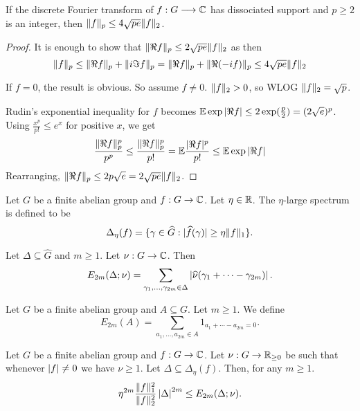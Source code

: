 \begin{lemma}
\label{rudin}
\leanok
If the discrete Fourier transform of $f : G \longrightarrow \mathbb{C}$ has dissociated support and $p \ge 2$ is an integer, then $\lVert f\rVert_p \le 4\sqrt{pe} \lVert f\rVert_2$.
\end{lemma}
\begin{proof}
\leanok
It is enough to show that $\lVert \Re f\rVert_p \le 2\sqrt{pe} \lVert f\rVert_2$ as then
$$\lVert f\rVert_p \le \lVert \Re f\rVert_p + \lVert i \Im f\rVert_p = \lVert \Re f\rVert_p + \lVert \Re (-if)\rVert_p \le 4\sqrt{pe} \lVert f\rVert_2$$

If $f = 0$, the result is obvious. So assume $f \ne 0$. $\lVert f\rVert_2 > 0$, so WLOG $\lVert f\rVert_2 = \sqrt p$.

Rudin's exponential inequality for $f$ becomes $\mathbb{E} \exp|\Re f| \le 2\exp(\frac p 2) = (2\sqrt e)^p$. Using $\frac{x^p}{p!} \le e^x$ for positive $x$, we get
$$\frac{\lVert \Re f\rVert_p^p}{p^p} \le \frac{\lVert \Re f\rVert_p^p}{p!} = \mathbb{E} \frac{|\Re f|^p}{p!} \le \mathbb{E} \exp|\Re f|$$
Rearranging, $\lVert \Re f\rVert_p \le 2 p\sqrt{e} = 2 \sqrt{pe} \lVert f\rVert_2$.
\end{proof}


\begin{definition}
\label{large_spec}
\leanok
Let $G$ be a finite abelian group and $f:G\to\mathbb{C}$. Let $\eta\in \mathbb{R}$. The $\eta$-large spectrum is defined to be
\[\Delta_\eta(f) = \{ \gamma\in\widehat{G} : \lvert \widehat{f}(\gamma)\rvert \geq \eta\lVert f\rVert_1\}.\]
\end{definition}


\begin{definition}
\label{weight_energy}
\leanok
Let $\Delta\subseteq \widehat{G}$ and $m\geq 1$. Let $\nu:G\to \mathbb{C}$. Then
\[E_{2m}(\Delta;\nu)=\sum_{\gamma_1,\ldots,\gamma_{2m}\in \Delta}\left\lvert \widehat{\nu}(\gamma_1+\cdots-\gamma_{2m})\right\rvert.\]
\end{definition}


\begin{definition}[Energy]
\label{energy}
\leanok
Let $G$ be a finite abelian group and $A\subseteq G$. Let $m\geq 1$. We define
\[E_{2m}(A)=\sum_{a_1,\ldots,a_{2m}\in A}1_{a_1+\cdots-a_{2m}=0}.\]
\end{definition}


\begin{lemma}
\label{general_hoelder}
\leanok
Let $G$ be a finite abelian group and $f:G\to\mathbb{C}$. Let $\nu:G\to \mathbb{R}_{\geq 0}$ be such that whenever $\left\lvert f\right\rvert\neq 0$ we have $\nu \geq 1$. Let $\Delta\subseteq \Delta_\eta(f)$. Then, for any $m\geq 1$.
\[\eta^{2m}\frac{\lVert f\rVert_1^2}{\lVert f\rVert_2^2}\left\lvert \Delta\right\rvert^{2m}\leq E_{2m}(\Delta;\nu).\]
\end{lemma}

